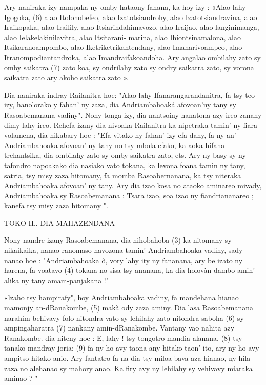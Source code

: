 Ary naniraka izy nampaka ny omby hataony fahana, ka hoy izy : 
«Alao lahy Igogoka, (6) alao Itolohobefeo, alao Izatotsiandrohy, alao Izatotsiandravina, alao Iraikopaka, 
alao Irailily, alao Itsiarindahimavozo, alao Iraijao, alao langinimanga, alao Ielakelakinilavitra, 
alao Itsitarani-
marina, alao Ihiontsinamalona, alao Itsikaranoampombo, alao Iketriketrikantendany, alao Imanarivoampeo, 
alao Itranompodiantandroka,
alao Imandraifakoandoha. 
Ary angalao ombilahy zato sy omby saikatra (7) zato koa, sy ondrilahy zato sy ondry saikatra zato, 
sy vorona saikatra zato ary akoho saikatra zato ».

Dia naniraka indray Railanitra hoe: "Alao lahy Ifanarangarandanitra, fa tsy teo izy, 
hanolorako y fahan' ny zaza, dia Andriambahoaká afovoan'ny tany sy Rasoabemanana vadiny". 
Nony tonga izy, dia nantsoiny hanatona azy ireo zanany dimy lahy ireo.
Rehefa izany dia nivoaka Railanitra ka nipetraka tamin' ny fiara volamena, dia nikabary hoe : 
"Efa vitako ny fahan' izy efa-dahy, fa ny an' Andriambahoaka afovoan' ny tany no tsy mbola efako, 
ka aoka hifana-trehantsika, dia ombilahy zato sy omby saikatra zato, ets. Ary ny basy sy ny tafondro napoakako 
dia nasiako vato tokana, ka levona foana tamin ny tany, satria, tsy misy zaza hitomany, 
fa momba Rasoabernanana, ka tsy niteraka Andriambahoaka afovoan' ny tany. 
Ary dia izao kosa no ataoko aminareo mivady, Andriambahoaka sy Rasoabemanana : 
Tsara izao, soa izao ny fiandriananareo ; kanefa tsy misy zaza hitomany ".


TOKO II.. DIA MAHAZENDANA

Nony nandre izany Rasoabemanana, dia nihobahoba (3) ka nitomany sy nikaikaika, 
nanao ranomaso havozona tamin' Andriambahoaka vadiny, sady nanao hoe : 
"Andriambahoaka ô, vory lahy ity ny fananana, ary be izato ny harena, fa voatavo (4) tokana no sisa tsy ananana, 
ka dia holovàn-dambo amin' alika ny tany amam-panjakana !"

«lzaho tsy hampirafy", hoy Andriambahoaka vadiny, fa mandehana hianao mamonjy an-dRanakombe, 
(5) makà ody zaza aminy. Dia lasa Rasoabemanana narahim-behivavy folo nitondra vato sy lehilahy zato
nitondra saboha (6) sy ampingaharatra (7) nankany amin-dRanakombe.
Vantany vao nahita azy Ranakombe. dia niteny hoe : E, lahy ! tsy tongotro mandia alanana, 
(8) tsy tanako mandray joria; (9) fa ny ho avy taona any hitako taon' ito, ary ny ho avy ampitso hitako anio. 
Ary fantatro fa na dia tsy miloa-bava aza hianao, ny hila zaza no alehanao sy mahory anao. 
Ka firy avy ny lehilahy sy vehivavy miaraka aminao ? "

